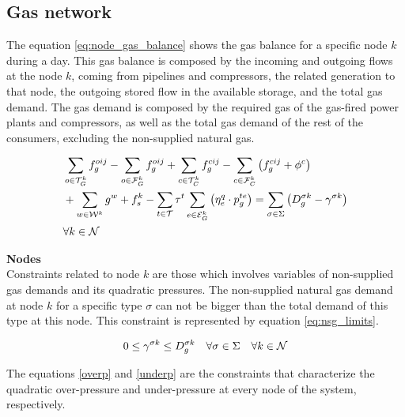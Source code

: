 \subsection{Gas network}

The equation \ref{eq:node_gas_balance} shows the gas balance for a specific node $k$ during a day. This gas balance is composed by the incoming and outgoing flows at the node $k$, coming from pipelines and compressors, the related generation to that node, the outgoing stored flow in the available storage, and the total gas demand. The gas demand is composed by the required gas of the gas-fired power plants and compressors, as well as the total gas demand of the rest of the consumers, excluding the non-supplied natural gas. 

\begin{equation}
\begin{aligned}
& \sum_{o \in {\cal{T}}^{k}_{G}}{{f}_{g}^{oij}} - \sum_{o \in {\cal{F}}^{k}_{G}}{{f}_{g}^{oij}} + \sum_{c \in {\cal{T}}^{k}_{C}}{{f}_{g}^{cij}} - \sum_{c \in {\cal{F}}^{k}_{C}}{ \left({f}_{g}^{cij} + \phi^{c}\right)} \\
& + \sum_{w \in {\cal{W}}^{k}}{g^{w}}  + {f}^{k}_{s} - \sum_{t \in \cal{T}} {\tau}^{t} \sum_{e \in {\cal{E}}^{k}_{G}}\left({\eta^{q}_{e}}\cdot {p_{g}^{te}}\right) = {\sum_{\sigma \in \Sigma}\left( D^{\sigma k}_{g} - \gamma^{\sigma k}\right)} \\
& \forall k \in \cal{N}
\end{aligned}
\label{eq:node_gas_balance}
\end{equation}

\newpage
\textbf{Nodes}\\

Constraints related to node $k$ are those which involves variables of non-supplied gas demands and its quadratic pressures. The non-supplied natural gas demand at node $k$ for a specific type $\sigma$ can not be bigger than the total demand of this type at this node. This constraint is represented by equation \ref{eq:nsg_limits}.

\begin{equation}
{0 \le \gamma^{\sigma k} \le D^{\sigma k}_{g} \quad \forall \sigma \in \Sigma \quad \forall k \in \cal{N}}
\label{eq:nsg_limits}
\end{equation}

The equations \ref{overp} and \ref{underp} are the constraints that characterize the quadratic over-pressure and under-pressure at every node of the system, respectively. 

